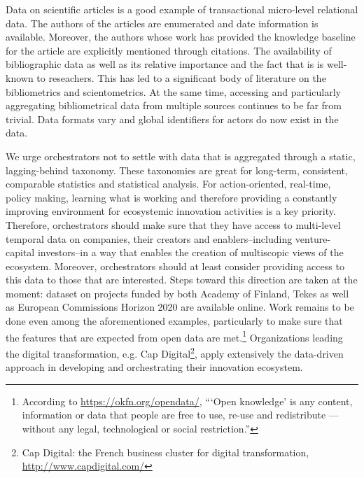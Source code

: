 Data on scientific articles is a good example of transactional micro-level relational data. The authors of the articles are enumerated and date information is available. Moreover, the authors whose work has provided the knowledge baseline for the article are explicitly mentioned through citations. The availability of bibliographic data as well as its relative importance and the fact that is is well-known to reseachers. This has led to a significant body of literature on the bibliometrics and scientometrics. At the same time, accessing and particularly aggregating bibliometrical data from multiple sources continues to be far from trivial. Data formats vary and global identifiers for actors do now exist in the data.

We urge orchestrators not to settle with data that is aggregated through a static, lagging-behind taxonomy. These taxonomies are great for long-term, consistent, comparable statistics and statistical analysis. For action-oriented, real-time, policy making, learning what is working and therefore providing a constantly improving environment for ecosystemic innovation activities is a key priority. Therefore, orchestrators should make sure that they have access to multi-level temporal data on companies, their creators and enablers--including venture-capital investors--in a way that enables the creation of multiscopic views of the ecosystem. Moreover, orchestrators should at least consider providing access to this data to those that are interested. Steps toward this direction are taken at the moment: dataset on projects funded by both Academy of Finland, Tekes as well as European Commissions Horizon 2020 are available online. Work remains to be done even among the aforementioned examples, particularly to make sure that the features that are expected from open data are met.\footnote{According to \href{Open Knowledge}{https://okfn.org/opendata/}, ``‘Open knowledge’ is any content, information or data that people are free to use, re-use and redistribute — without any legal, technological or social restriction.''} Organizations leading the digital transformation, e.g. Cap Digital\footnote{Cap Digital: the French business cluster for digital transformation, \url{http://www.capdigital.com/}}, apply extensively the data-driven approach in developing and orchestrating their innovation ecosystem.

